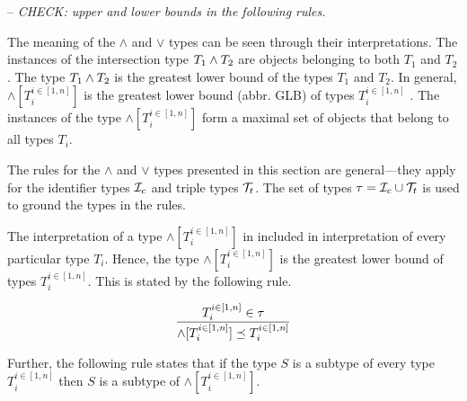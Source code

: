 \documentclass[runningheads]{llncs}
\newcommand{\I}{{\cal I}}
\newcommand{\T}{{\cal T}}
\newcommand{\memo}[1]{}
\newcommand{\notes}[1]{\noindent\begin{small}-- \emph{#1}\hfill\break\end{small}}
\begin{document}
\memo{
The meaning of the $\land$ and $\lor$ types can be defined through
their interpretations. The following definition expresses the
denotation of a $\lor$ type with the interpretations of its component
types. Suppose we have a set of types
$\forall\/i\in\/[1..n],\ T_i\in\tau$.

\begin{displaymath}
  \llbracket\lor[T_i^{i\in[1,n]}]\rrbracket_\D = \bigcup_{i\in[1..n]}\llbracket\/T_i\rrbracket_\D
\end{displaymath}

Similarly, the interpretation of a $\land$ type is the intersection of
the interpretations of its component types.

\begin{displaymath}
\llbracket\land[T_i^{i\in[1,n]}]\rrbracket_\D = \bigcap_{i\in[1..n]}\llbracket\/T_i\rrbracket_\D
\end{displaymath}}

\notes{CHECK: upper and lower bounds in the following rules.}

The meaning of the $\land$ and $\lor$ types can be seen through
their interpretations. The instances of the intersection type
$T_1\land\/T_2$ are objects belonging to both $T_1$ and $T_2$. The
type $T_1\land\/T_2$ is the greatest lower bound of the types $T_1$
and $T_2$. In general, $\land[T_i^{i\in[1,n]}]$ is the greatest lower
bound (abbr. GLB) of types $T_i^{i\in[1,n]}$
\cite{Pierce1991,Pierce1996}. The instances of the type
$\land[T_i^{i\in[1,n]}]$ form a maximal set of objects that belong to
all types $T_i$.

The rules for the $\land$ and $\lor$ types presented in this section
are general---they apply for the identifier types $\I_c$ and triple
types $\T_t$. The set of types $\tau=\I_c\cup\T_t$ is used to ground
the types in the rules.

The interpretation of a type $\land[T_i^{i\in[1,n]}]$ in included in
interpretation of every particular type $T_i$. Hence, the type
$\land[T_i^{i\in[1,n]}]$ is the greatest lower bound of types
$T_i^{i\in[1,n]}$. This is stated by the following rule.

\begin{equation}
\label{rul:land-preceq-elems}
\dfrac{T_i^{i\in[1,n]}\in\tau}
      {\land[T_i^{i\in[1,n]}] \preceq\/T_i^{i\in[1,n]}} 
\end{equation}

Further, the following rule states that if the type $S$ is a subtype
of every type $T_i^{i\in[1,n]}$ then $S$ is a subtype of
$\land[T_i^{i\in[1,n]}]$.
\end{document}
